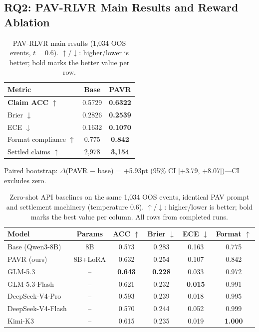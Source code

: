 \documentclass[sigconf, anonymous, review]{acmart}
\begin{document}
\subsection{RQ2: PAV-RLVR Main Results and Reward Ablation}
\label{sec:ablation}

\begin{table}[t]
\centering\small
\caption{PAV-RLVR main results (1,034 OOS events, $t=0.6$). $\uparrow$/$\downarrow$: higher/lower is better; bold marks the better value per row.}
\label{tab:main}
\begin{tabular}{@{}lcc@{}}
\toprule
Metric & Base & PAVR \\
\midrule
\textbf{Claim ACC} $\uparrow$ & 0.5729 & \textbf{0.6322} \\
Brier $\downarrow$ & 0.2826 & \textbf{0.2539} \\
ECE $\downarrow$ & 0.1632 & \textbf{0.1070} \\
Format compliance $\uparrow$ & 0.775 & \textbf{0.842} \\
Settled claims $\uparrow$ & 2,978 & \textbf{3,154} \\
\bottomrule
\end{tabular}
\end{table}

Paired bootstrap: $\Delta$(PAVR $-$ base) = +5.93pt (95\% CI [+3.79, +8.07])---CI excludes zero.

\begin{table}[t]
\centering\small
\caption{Zero-shot API baselines on the same 1,034 OOS events, identical PAV prompt and settlement machinery (temperature 0.6). $\uparrow$/$\downarrow$: higher/lower is better; bold marks the best value per column. All rows from completed runs.}
\label{tab:external}
\setlength{\tabcolsep}{5pt}
\begin{tabular}{@{}lccccc@{}}
\toprule
Model & Params & ACC $\uparrow$ & Brier $\downarrow$ & ECE $\downarrow$ & Format $\uparrow$ \\
\midrule
Base (Qwen3-8B) & 8B & 0.573 & 0.283 & 0.163 & 0.775 \\
PAVR (ours) & 8B+LoRA & 0.632 & 0.254 & 0.107 & 0.842 \\
\midrule
GLM-5.3 & -- & \textbf{0.643} & \textbf{0.228} & 0.033 & 0.972 \\
GLM-5.3-Flash & -- & 0.621 & 0.232 & \textbf{0.015} & 0.991 \\
DeepSeek-V4-Pro & -- & 0.593 & 0.239 & 0.018 & 0.995 \\
DeepSeek-V4-Flash & -- & 0.570 & 0.244 & 0.052 & 0.999 \\
Kimi-K3 & -- & 0.615 & 0.235 & 0.019 & \textbf{1.000} \\
\bottomrule
\end{tabular}
\end{table}
\end{document}
